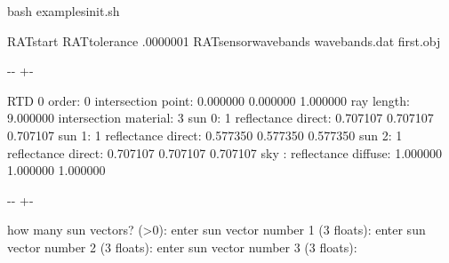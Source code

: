 \documentclass[letterpaper,10pt,english]{sphinxmanual}
\newlength\nbsphinxcodecellspacing
\begin{document}
{
\begin{sphinxVerbatim}[commandchars=\\\{\}]
\llap{\color{nbsphinxin}[17]:\,\hspace{\fboxrule}\hspace{\fboxsep}}\PYGZpc{}\PYGZpc{}bash
 examples\PYGZus{}init.sh

RATstart \PYGZhy{}RATtolerance .0000001 \PYGZhy{}RATsensor\PYGZus{}wavebands wavebands.dat first.obj 

\end{sphinxVerbatim}
}

{

\kern-\sphinxverbatimsmallskipamount\kern-\baselineskip
\kern+\FrameHeightAdjust\kern-\fboxrule
\vspace{\nbsphinxcodecellspacing}

\begin{sphinxVerbatim}[commandchars=\\\{\}]
RTD 0
order: 0        intersection point:     0.000000 0.000000 1.000000
                ray length:             9.000000
                intersection material:  3
                sun 0:                  1 reflectance
                direct:                 0.707107 0.707107 0.707107
                sun 1:                  1 reflectance
                direct:                 0.577350 0.577350 0.577350
                sun 2:                  1 reflectance
                direct:                 0.707107 0.707107 0.707107
                sky  :                  reflectance
                diffuse:                1.000000 1.000000 1.000000
\end{sphinxVerbatim}
}

{

\kern-\sphinxverbatimsmallskipamount\kern-\baselineskip
\kern+\FrameHeightAdjust\kern-\fboxrule
\vspace{\nbsphinxcodecellspacing}

\begin{sphinxVerbatim}[commandchars=\\\{\}]
how many sun vectors? (>0): enter sun vector number 1 (3 floats): enter sun vector number 2 (3 floats): enter sun vector number 3 (3 floats):
\end{sphinxVerbatim}
}
\end{document}
